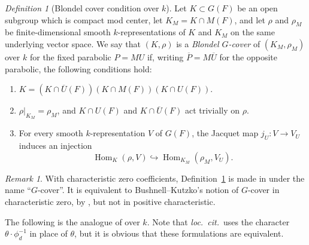 \documentclass[reqno]{amsart}
\numberwithin{equation}{subsection}
\newcommand{\ol}[1]{\overline{#1}}
\newcommand{\co}{\colon}
\DeclareMathOperator{\Hom}{Hom}
\theoremstyle{remark}
\newtheorem{remark}[thm]{Remark}
\newtheorem{defn}[thm]{Definition}
\numberwithin{equation}{subsection}
\numberwithin{figure}{subsection}
\begin{document}
\begin{defn}[Blondel cover condition over $k$]\label{def:blondel-cover}
Let $K\subset G(F)$ be an open subgroup which is compact mod center, let $K_M=K\cap M(F)$, and let $\rho$ and $\rho_M$ be finite-dimensional smooth $k$-representations of $K$ and $K_M$ on the same underlying vector space. We say that $(K,\rho)$ is a \emph{Blondel $G$-cover} of $(K_M,\rho_M)$ over $k$ for the fixed parabolic $P=MU$ if, writing $\ol P=M\ol U$ for the opposite parabolic, the following conditions hold:
\begin{enumerate}[label=(\roman*)]
\item\label{itm:decomp} $K=(K\cap\ol U(F))(K\cap M(F))(K\cap U(F))$. 
\item\label{itm:inflation} $\rho|_{K_M}=\rho_M$, and $K\cap U(F)$ and $K\cap\ol U(F)$ act trivially on $\rho$.
\item\label{itm:injective-jacquet} For every smooth $k$-representation $V$ of $G(F)$, the Jacquet map $j_U\co V\to V_U$ induces an injection
\begin{equation}\label{eq:injective-cover-hom}
\Hom_K(\rho,V)\hookrightarrow \Hom_{K_M}(\rho_M,V_U).
\end{equation}
\end{enumerate}
\end{defn}

\begin{remark}\label{rem:injective-vs-strong}
With characteristic zero coefficients, Definition~\ref{def:blondel-cover} is made in \cite[Definition 4.2]{KY17} under the name ``$G$-cover''. It is equivalent to Bushnell--Kutzko's notion of $G$-cover \cite[\S 8]{BK} in characteristic zero, by \cite[Th\'eor\`eme~1]{Blondel97}, but not in positive characteristic. 
\end{remark}

The following is the analogue of \cite[Theorem 6.3]{KY17} over $k$. Note that \textit{loc.\ cit.}\ uses the character $\theta \cdot \phi_d^{-1}$ in place of $\theta$, but it is obvious that these formulations are equivalent. %
\end{document}
